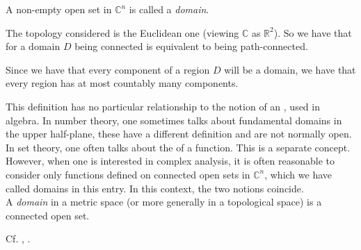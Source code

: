 \documentclass[12pt]{article}
\begin{document}
A  non-empty open set in $\mathbb{C}^n$ is called a \emph{domain}.

The topology considered is the Euclidean one (viewing $\mathbb{C}$ as $\mathbb{R}^2$). So we have that for a domain $D$ being connected is equivalent to being path-connected.

Since we have that every component of a region $D$ will be a domain, we have that every region has at most countably many components.

This definition has no particular relationship to the notion of an , used in algebra.  In number theory, one sometimes talks about fundamental domains in the upper half-plane, these have a different definition and are not normally open.  In set theory, one often talks about the  of a function.  This is a separate concept.  However, when one is interested in complex analysis, it is often reasonable to consider only functions defined on connected open sets in $\mathbb{C}^n$, which we have called domains in this entry.  In this context, the two notions coincide.\\

A \emph{domain} in a metric space (or more generally in a topological space) is a connected open set.

Cf. , 
.
\end{document}
